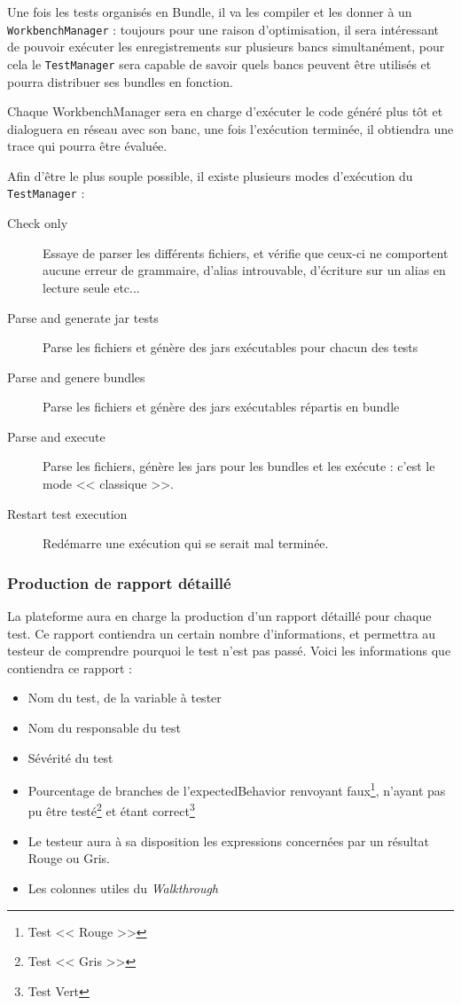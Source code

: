 	Une fois les tests organisés en Bundle, il va les compiler et les donner à un \texttt{WorkbenchManager} : toujours pour une raison d'optimisation, il sera intéressant de pouvoir exécuter les enregistrements sur plusieurs bancs simultanément, pour cela le \texttt{TestManager} sera capable de savoir quels bancs peuvent être utilisés et pourra distribuer ses bundles en fonction. 

	Chaque WorkbenchManager sera en charge d'exécuter le code généré plus tôt et dialoguera en réseau avec son banc, une fois l'exécution terminée, il obtiendra une trace qui pourra être évaluée.

	Afin d'être le plus souple possible, il existe plusieurs modes d'exécution du \texttt{TestManager} : 
	\begin{description}
		\item[Check only] Essaye de parser les différents fichiers, et vérifie que ceux-ci ne comportent aucune erreur de grammaire, d'alias introuvable, d'écriture sur un alias en lecture seule etc...
		\item[Parse and generate jar tests] Parse les fichiers et génère des jars exécutables pour chacun des tests
		\item[Parse and genere bundles] Parse les fichiers et génère des jars exécutables répartis en bundle
		\item[Parse and execute] Parse les fichiers, génère les jars pour les bundles et les exécute : c'est le mode << classique >>.
		\item[Restart test execution] Redémarre une exécution qui se serait mal terminée.
	\end{description}
	\subsubsection{Production de rapport détaillé}\label{report}
	La plateforme aura en charge la production d'un rapport détaillé pour chaque test. Ce rapport contiendra un certain nombre d'informations, et permettra au testeur de comprendre pourquoi le test n'est pas passé. Voici les informations que contiendra ce rapport : 

	\begin{itemize}
		\item Nom du test, de la variable à tester
		\item Nom du responsable du test
		\item Sévérité du test
		\item Pourcentage de branches de l'expectedBehavior renvoyant faux\footnote{Test << Rouge >>}, n'ayant pas pu être testé\footnote{Test << Gris >>} et étant correct\footnote{Test Vert}
		\item Le testeur aura à sa disposition les expressions concernées par un résultat Rouge ou Gris.
		\item Les colonnes utiles du \textit{Walkthrough}
	\end{itemize}

